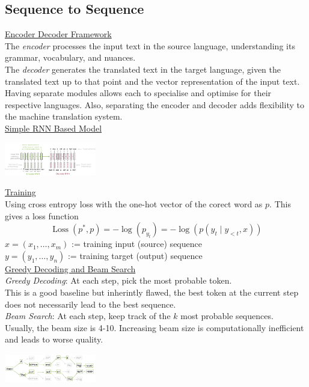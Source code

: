 \documentclass[8pt]{extarticle} %
\begin{document}
\begin{multicols*}{3}
\subsection*{Sequence to Sequence}
\underline{Encoder Decoder Framework}\\

The \textit{encoder} processes the input text in the source language, 
understanding its grammar, vocabulary, and nuances. \\

The \textit{decoder} generates the translated text 
in the target language, given the translated text up 
to that point and the vector representation of the input text. \\

Having separate modules allows each to specialise and optimise for their respective languages. Also, separating the encoder and decoder adds flexibility to the machine translation system. \\

\underline{Simple RNN Based Model}
\begin{center}
    \includegraphics[width=0.3\textwidth]{media/seq2seqrnn.png}
\end{center}

\underline{Training}\\

Using cross entropy loss with the one-hot vector of the corect word as $p$. This gives a loss function
$$\operatorname{Loss}\left(p^*, p\right)=-\log \left(p_{y_t}\right)=-\log \left(p\left(y_t \mid y_{<t}, x\right)\right)$$
$x=\left(x_1, \ldots, x_m\right)$ := training input (source) sequence\\
$y=\left(y_1, \ldots, y_n\right)$ := training target (output) sequence\\

\underline{Greedy Decoding and Beam Search}\\

\textit{Greedy Decoding}: At each step, pick the most probable token.\\
This is a good baseline but inherintly flawed, the best token at the current step does not necessarily lead to the best sequence.\\

\textit{Beam Search}: At each step, keep track of the $k$ most probable sequences.\\
Usually, the beam size is 4-10. Increasing beam size is computationally inefficient and leads to worse quality.
\begin{center}
    \includegraphics[width=0.3\textwidth]{media/beam-search.png}
\end{center}    


\end{multicols*}
\end{document}
